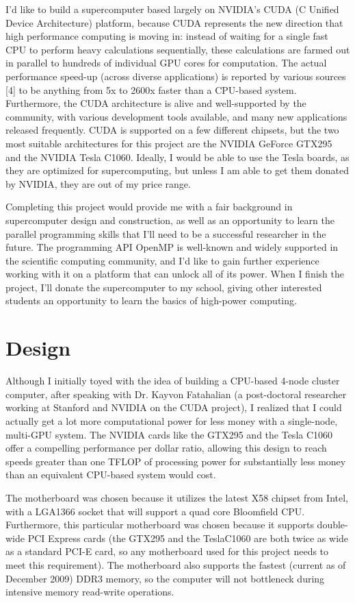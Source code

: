 \documentclass{article}      %
\begin{document}
I'd like to build a supercomputer based largely on NVIDIA's CUDA (C Unified Device Architecture) platform, because CUDA represents the new direction that high performance computing is moving in: instead of waiting for a single fast CPU to perform heavy calculations sequentially, these calculations are farmed out in parallel to hundreds of individual GPU cores for computation. The actual performance speed-up (across diverse applications) is reported by various sources [4] to be anything from 5x to 2600x faster than a CPU-based system.  Furthermore, the CUDA architecture is alive and well-supported by the community, with various development tools available, and many new applications released frequently. CUDA is supported on a few different chipsets, but the two most suitable architectures for this project are the NVIDIA GeForce GTX295 and the NVIDIA Tesla C1060. Ideally, I would be able to use the Tesla boards, as they are optimized for supercomputing, but unless I am able to get them donated by NVIDIA, they are out of my price range.

Completing this project would provide me with a fair background in supercomputer design and construction, as well as an opportunity to learn the parallel programming skills that I'll need to be a successful researcher in the future. The programming API OpenMP is well-known and widely supported in the scientific computing community, and I'd like to gain further experience working with it on a platform that can unlock all of its power. When I finish the project, I'll donate the supercomputer to my school, giving other interested students an opportunity to learn the basics of high-power computing.

\section{Design}
Although I initially toyed with the idea of building a CPU-based 4-node cluster computer, after speaking with Dr. Kayvon Fatahalian (a post-doctoral researcher working at Stanford and NVIDIA on the CUDA project), I realized that I could actually get a lot more computational power for less money with a single-node, multi-GPU system. The NVIDIA cards like the GTX295 and the Tesla C1060 offer a compelling performance per dollar ratio, allowing this design to reach speeds greater than one TFLOP of processing power for substantially less money than an equivalent CPU-based system would cost. 

The motherboard was chosen because it utilizes the latest X58 chipset from Intel, with a LGA1366 socket that will support a quad core Bloomfield CPU. Furthermore, this particular motherboard was chosen because it supports double-wide PCI Express cards (the GTX295 and the TeslaC1060 are both twice as wide as a standard PCI-E card, so any motherboard used for this project needs to meet this requirement). The motherboard also supports the  fastest (current as of December 2009) DDR3 memory, so the computer will not bottleneck during intensive memory read-write operations.
\end{document}
